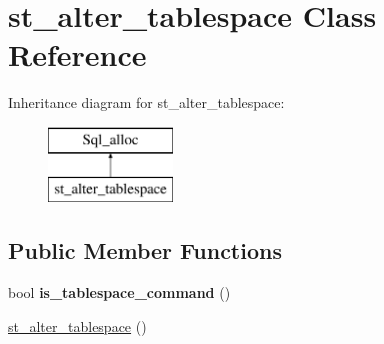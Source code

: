 \hypertarget{classst__alter__tablespace}{}\section{st\+\_\+alter\+\_\+tablespace Class Reference}
\label{classst__alter__tablespace}
Inheritance diagram for st\+\_\+alter\+\_\+tablespace\+:\begin{figure}[H]
\begin{center}
\leavevmode
\includegraphics[height=2.000000cm]{classst__alter__tablespace}
\end{center}
\end{figure}
\subsection*{Public Member Functions}
\begin{DoxyCompactItemize}
\item 
\mbox{\label{classst__alter__tablespace_af88a8a1bc12cec7a22cb75b0c7a20fc6}} 
bool {\bfseries is\+\_\+tablespace\+\_\+command} ()
\item 
\mbox{\hyperlink{classst__alter__tablespace_ad394f40c80785ff5fe0c33d91dc01c07}{st\+\_\+alter\+\_\+tablespace}} ()
\end{DoxyCompactItemize}
